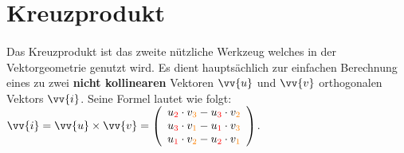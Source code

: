 \section{Kreuzprodukt}

    \paragraph{} Das Kreuzprodukt ist das zweite nützliche Werkzeug welches in der Vektorgeometrie genutzt wird. Es dient hauptsächlich zur einfachen Berechnung
    eines zu zwei \textbf{nicht kollinearen} Vektoren $\vv{u}$ und $\vv{v}$ orthogonalen Vektors $\vv{i}$. Seine Formel lautet wie folgt:
    $\vv{i} = \vv{u} \times \vv{v} \definedBy \left(\begin{array}{c} u_{\textcolor{red}{2}} \cdot v_{\textcolor{orange}{3}} - u_{\textcolor{red}{3}} \cdot v_{\textcolor{orange}{2}} \\ u_{\textcolor{red}{3}} \cdot v_{\textcolor{orange}{1}} - u_{\textcolor{red}{1}} \cdot v_{\textcolor{orange}{3}} \\ u_{\textcolor{red}{1}} \cdot v_{\textcolor{orange}{2}} - u_{\textcolor{red}{2}} \cdot v_{\textcolor{orange}{1}} \end{array}\right)$.
